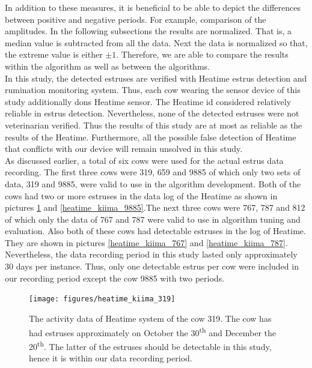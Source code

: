 \documentclass[english,12pt,a4paper,pdftex,elec,utf8]{aaltothesis}
\begin{document}
In addition to these measures, it is beneficial to be able to depict the differences between positive and negative periods. For example, comparison of the amplitudes. In the following subsections the results are normalized. That is, a median value is subtracted from all the data. Next the data is normalized so that, the extreme value is either $\pm1$. Therefore, we are able to compare the results within the algorithm as well as between the algorithms. \\
In this study, the detected estruses are verified with Heatime estrus detection and rumination monitoring system. Thus, each cow wearing the sensor device of this study additionally dons Heatime sensor. The Heatime id considered relatively reliable in estrus detection. Nevertheless, none of the detected estruses were not veterinarian verified. Thus the results of this study are at most as reliable as the results of the Heatime. Furthermore, all the possible false detection of Heatime that conflicts with our device will remain unsolved in this study. \\
As discussed earlier, a total of six cows were used for the actual estrus data recording. The first three cows were 319, 659 and 9885 of which only two sets of data, 319 and 9885, were valid to use in the algorithm development. Both of the cows had two or more estruses in the data log of the Heatime as shown in pictures \ref{heatime_kiima_319} and \ref{heatime_kiima_9885}.The next three cows were 767, 787 and 812 of which only the data of 767 and 787 were valid to use in algorithm tuning and evaluation. Also both of these cows had detectable estruses in the log of Heatime. They are shown in pictures \ref{heatime_kiima_767} and \ref{heatime_kiima_787}. Nevertheless, the data recording period in this study lasted only approximately 30 days per instance. Thus, only one detectable estrus per cow were included in our recording period except the cow 9885 with two periods.


\begin{figure}[htb]
\centering
\texttt{[image: figures/heatime\_kiima\_319]}
\caption{The activity data of Heatime system of the cow 319. The cow has had estruses approximately on October the 30\textsuperscript{th} and December the 20\textsuperscript{th}. The latter of the estruses should be detectable in this study, hence it is within our data recording period.}
\label{heatime_kiima_319}
\end{figure}
\end{document}
